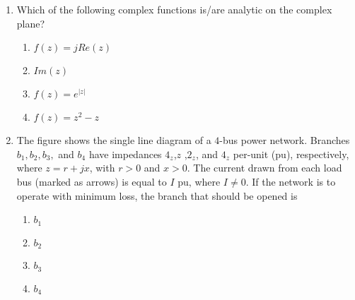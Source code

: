 \documentclass[journal,12pt,onecolumn]{IEEEtran}
\theoremstyle{remark}
\begin{document}
\begin{enumerate}
\item Which of the following complex functions is/are analytic on the complex plane? 
\begin{enumerate}
    \item $f(z)=jRe(z)$
    \item $Im(z)$
    \item $f(z)=e^{|z|}$
    \item $f(z)=z^2-z$ \\
\end{enumerate}


\item The figure shows the single line diagram of a $4$-bus power network. Branches $b_1, b_2, b_3,$ and $b_4$ have impedances $4_z$,$z$ ,$2_z$, and $4_z$ per-unit (pu), respectively, where  
$z=r+jx$, with $r>0$ and $x>0$. The current drawn from each load bus (marked 
as arrows) is equal to $I$ pu, where $I\neq 0$. If the network is to operate with minimum 
loss, the branch that should be opened is

\begin{enumerate}
    \item $b_1$
    \item $b_2$
    \item $b_3$
    \item $b_4$ \\
\end{enumerate}


\end{enumerate}
\end{document}
